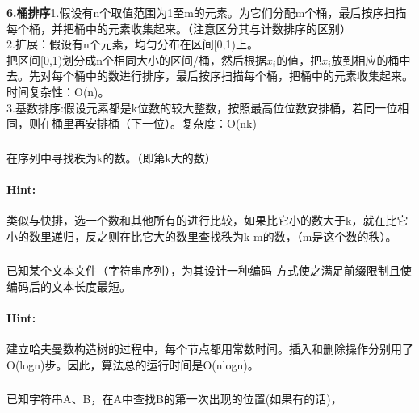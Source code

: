 \documentclass{article}
\begin{document}
       \textbf{6.桶排序}1.假设有n个取值范围为1至m的元素。为它们分配m个桶，最后按序扫描每个桶，并把桶中的元素收集起来。（注意区分其与计数排序的区别）\\
       2.扩展：假设有n个元素，均匀分布在区间[0,1)上。\\
把区间[0,1)划分成n个相同大小的区间/桶，然后根据$x_i$的值，把$x_i$放到相应的桶中去。先对每个桶中的数进行排序，最后按序扫描每个桶，把桶中的元素收集起来。时间复杂性：O(n)。\\
        3.基数排序:假设元素都是k位数的较大整数，按照最高位位数安排桶，若同一位相同，则在桶里再安排桶（下一位）。复杂度：O(nk)
    
       \subsubsection{}在序列中寻找秩为k的数。（即第k大的数）
     \paragraph{Hint:}类似与快排，选一个数和其他所有的进行比较，如果比它小的数大于k，就在比它小的数里递归，反之则在比它大的数里查找秩为k-m的数，（m是这个数的秩）。
     
      \subsubsection{}已知某个文本文件（字符串序列），为其设计一种编码
方式使之满足前缀限制且使编码后的文本长度最短。
     \paragraph{Hint:}建立哈夫曼数构造树的过程中，每个节点都用常数时间。插入和删除操作分别用了O(logn)步。因此，算法总的运行时间是O(nlogn)。
     
     \subsubsection{}已知字符串A、B，在A中查找B的第一次出现的位置(如果有的话)，
\end{document}
